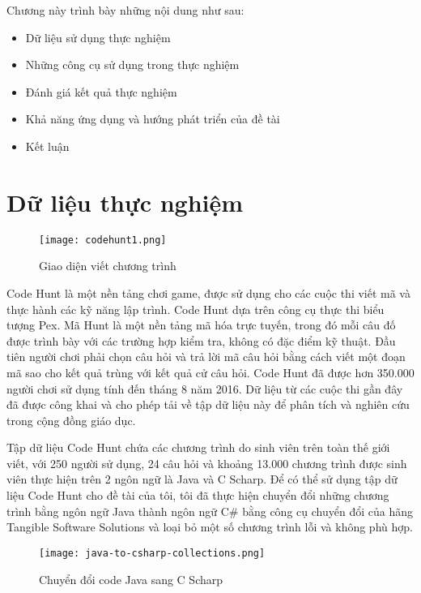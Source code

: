 Chương này trình bày những nội dung như sau:
\begin{itemize}
	\item Dữ liệu sử dụng thực nghiệm
	\item Những công cụ sử dụng trong thực nghiệm
	\item Đánh giá kết quả thực nghiệm
	\item Khả năng ứng dụng và hướng phát triển của đề tài
	\item Kết luận
\end{itemize}

\section{Dữ liệu thực nghiệm}
\label{sec:data}
\begin{center}
	\begin{figure}[htp]
		\begin{center}
			\texttt{[image: codehunt1.png]}
		\end{center}
		\caption{Giao diện viết chương trình}
		\label{refhinh1}
	\end{figure}
\end{center}

Code Hunt \cite{CodeHunt} là một nền tảng chơi game, được sử dụng cho các cuộc thi viết mã và thực hành các kỹ năng lập trình. Code Hunt dựa trên công cụ thực thi biểu tượng Pex. Mã Hunt là một nền tảng mã hóa trực tuyến, trong đó mỗi câu đố được trình bày với các trường hợp kiểm tra, không có đặc điểm kỹ thuật. Đầu tiên người chơi phải chọn câu hỏi và trả lời mã câu hỏi bằng cách viết một đoạn mã sao cho kết quả trùng với kết quả cử câu hỏi. Code Hunt đã được hơn 350.000 người chơi sử dụng tính đến tháng 8 năm 2016. Dữ liệu từ các cuộc thi gần đây đã được công khai và cho phép tải về tập dữ liệu này để phân tích và nghiên cứu trong cộng đồng giáo dục.


Tập dữ liệu Code Hunt chứa các chương trình do sinh viên trên toàn thế giới viết, với 250 người sử dụng, 24 câu hỏi và khoảng 13.000 chương trình được sinh viên thực hiện trên 2 ngôn ngữ là Java và C Scharp. Để có thể sử dụng tập dữ liệu Code Hunt cho đề tài của tôi, tôi đã thực hiện chuyển đổi những chương trình bằng ngôn ngữ Java thành ngôn ngữ C\#  bằng công cụ chuyển đổi của hãng Tangible Software Solutions và loại bỏ một số chương trình lỗi và không phù hợp.


\begin{center}
	\begin{figure}[htp]
		\begin{center}
			\texttt{[image: java-to-csharp-collections.png]}
		\end{center}
		\caption{Chuyển đổi code Java sang C Scharp}
		\label{refhinh1}
	\end{figure}
\end{center}

